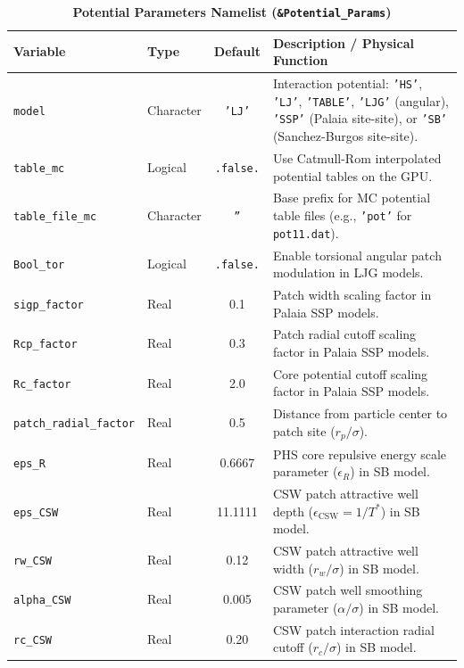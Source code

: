 \documentclass[final,5p,times,twocolumn]{elsarticle}
\begin{document}
\begin{table}[tbp]
\centering
\small
\caption{\textbf{Potential Parameters Namelist (\texttt{\&Potential\_Params})}}
\label{tab:nml_pot}
\begin{tabularx}{\textwidth}{l l c X}
\toprule
\textbf{Variable} & \textbf{Type} & \textbf{Default} & \textbf{Description / Physical Function} \\
\midrule
\texttt{model} & Character & \texttt{'LJ'} & Interaction potential: \texttt{'HS'}, \texttt{'LJ'}, \texttt{'TABLE'}, \texttt{'LJG'} (angular), \texttt{'SSP'} (Palaia site-site), or \texttt{'SB'} (Sanchez-Burgos site-site). \\
\texttt{table\_mc} & Logical & \texttt{.false.} & Use Catmull-Rom interpolated potential tables on the GPU. \\
\texttt{table\_file\_mc}& Character & \texttt{''} & Base prefix for MC potential table files (e.g., \texttt{'pot'} for \texttt{pot11.dat}). \\
\texttt{Bool\_tor} & Logical & \texttt{.false.} & Enable torsional angular patch modulation in LJG models. \\
\texttt{sigp\_factor} & Real & 0.1 & Patch width scaling factor in Palaia SSP models. \\
\texttt{Rcp\_factor} & Real & 0.3 & Patch radial cutoff scaling factor in Palaia SSP models. \\
\texttt{Rc\_factor} & Real & 2.0 & Core potential cutoff scaling factor in Palaia SSP models. \\
\texttt{patch\_radial\_factor}& Real & 0.5 & Distance from particle center to patch site ($r_p / \sigma$). \\
\texttt{eps\_R} & Real & 0.6667 & PHS core repulsive energy scale parameter ($\epsilon_R$) in SB model. \\
\texttt{eps\_CSW} & Real & 11.1111 & CSW patch attractive well depth ($\epsilon_{\text{CSW}} = 1/T^*$) in SB model. \\
\texttt{rw\_CSW} & Real & 0.12 & CSW patch attractive well width ($r_w / \sigma$) in SB model. \\
\texttt{alpha\_CSW} & Real & 0.005 & CSW patch well smoothing parameter ($\alpha / \sigma$) in SB model. \\
\texttt{rc\_CSW} & Real & 0.20 & CSW patch interaction radial cutoff ($r_c / \sigma$) in SB model. \\
\bottomrule
\end{tabularx}
\end{table}
\end{document}
